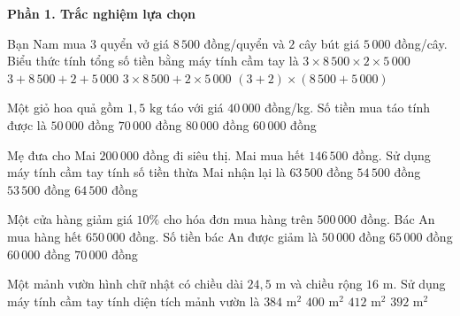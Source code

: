 \textbf{Phần 1. Trắc nghiệm lựa chọn}

\begin{ex} %
Bạn Nam mua $3$ quyển vở giá $8\,500$ đồng/quyển và $2$ cây bút giá $5\,000$ đồng/cây. Biểu thức tính tổng số tiền bằng máy tính cầm tay là
\choice
{$3 \times 8\,500 \times 2 \times 5\,000$}
{$3 + 8\,500 + 2 + 5\,000$}
{\True $3 \times 8\,500 + 2 \times 5\,000$}
{$(3 + 2) \times (8\,500 + 5\,000)$}
\end{ex}

\begin{ex} %
Một giỏ hoa quả gồm $1{,}5\text{ kg}$ táo với giá $40\,000$ đồng/kg. Số tiền mua táo tính được là
\choice
{$50\,000$ đồng}
{$70\,000$ đồng}
{$80\,000$ đồng}
{\True $60\,000$ đồng}
\end{ex}

\begin{ex} %
Mẹ đưa cho Mai $200\,000$ đồng đi siêu thị. Mai mua hết $146\,500$ đồng. Sử dụng máy tính cầm tay tính số tiền thừa Mai nhận lại là
\choice
{$63\,500$ đồng}
{$54\,500$ đồng}
{\True $53\,500$ đồng}
{$64\,500$ đồng}
\end{ex}

\begin{ex} %
Một cửa hàng giảm giá $10\%$ cho hóa đơn mua hàng trên $500\,000$ đồng. Bác An mua hàng hết $650\,000$ đồng. Số tiền bác An được giảm là
\choice
{$50\,000$ đồng}
{\True $65\,000$ đồng}
{$60\,000$ đồng}
{$70\,000$ đồng}
\end{ex}

\begin{ex} %
Một mảnh vườn hình chữ nhật có chiều dài $24{,}5\text{ m}$ và chiều rộng $16\text{ m}$. Sử dụng máy tính cầm tay tính diện tích mảnh vườn là
\choice
{$384\text{ m}^2$}
{$400\text{ m}^2$}
{$412\text{ m}^2$}
{\True $392\text{ m}^2$}
\end{ex}

